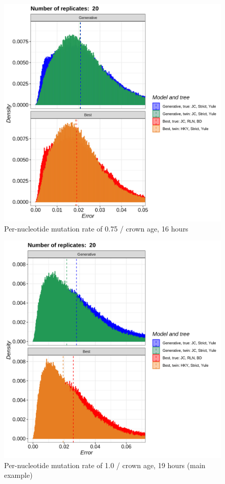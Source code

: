 \begin{figure}[H]
  \includegraphics[width=\textwidth]{pirouette_example_37/errors.png}
  \caption{Per-nucleotide mutation rate of 0.75 / crown age, 16 hours}
\end{figure}

\begin{figure}[H]
  \includegraphics[width=\textwidth]{pirouette_example_28/errors.png}
  \caption{Per-nucleotide mutation rate of 1.0 / crown age, 19 hours (main example)}
\end{figure}

